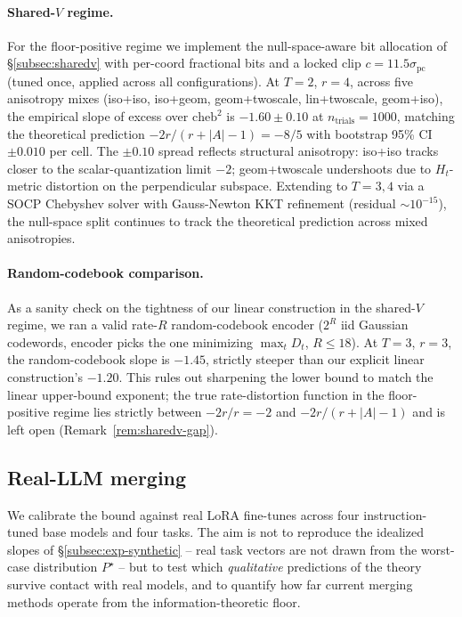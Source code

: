 \paragraph{Shared-$V$ regime.} For the floor-positive regime
we implement the null-space-aware bit allocation of
\S\ref{subsec:sharedv} with per-coord fractional bits and a
locked clip $c = 11.5\sigma_{\mathrm{pc}}$ (tuned once, applied
across all configurations). At $T = 2$, $r = 4$, across five
anisotropy mixes (iso+iso, iso+geom, geom+twoscale, lin+twoscale,
geom+iso), the empirical slope of excess over
$\mathrm{cheb}^2$ is $-1.60 \pm 0.10$ at $n_{\mathrm{trials}} =
1000$, matching the theoretical prediction
$-2r/(r + |A| - 1) = -8/5$ with bootstrap 95\% CI $\pm 0.010$
per cell. The $\pm 0.10$ spread reflects structural anisotropy:
iso+iso tracks closer to the scalar-quantization limit $-2$;
geom+twoscale undershoots due to $H_t$-metric distortion on the
perpendicular subspace. Extending to $T = 3, 4$ via a SOCP
Chebyshev solver with Gauss-Newton KKT refinement (residual
$\sim 10^{-15}$), the null-space split continues to track the
theoretical prediction across mixed anisotropies.

\paragraph{Random-codebook comparison.} As a sanity check on
the tightness of our linear construction in the shared-$V$
regime, we ran a valid rate-$R$ random-codebook encoder ($2^R$
iid Gaussian codewords, encoder picks the one minimizing
$\max_t D_t$, $R \leq 18$). At $T = 3$, $r = 3$, the
random-codebook slope is $-1.45$, strictly steeper than our
explicit linear construction's $-1.20$. This rules out
sharpening the lower bound to match the linear upper-bound
exponent; the true rate-distortion function in the
floor-positive regime lies strictly between $-2r/r = -2$ and
$-2r/(r + |A| - 1)$ and is left open
(Remark~\ref{rem:sharedv-gap}).

\subsection{Real-LLM merging}\label{subsec:exp-lora}\label{subsec:exp-multiseed}

We calibrate the bound against real LoRA fine-tunes across four
instruction-tuned base models and four tasks. The aim is not to
reproduce the idealized slopes of \S\ref{subsec:exp-synthetic} --
real task vectors are not drawn from the worst-case distribution
$P^\star$ -- but to test which \emph{qualitative} predictions of
the theory survive contact with real models, and to quantify how
far current merging methods operate from the
information-theoretic floor.

